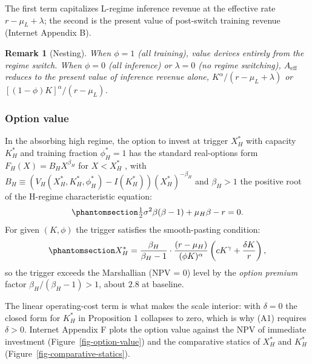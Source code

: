 \documentclass[
  11pt,
  letterpaper,
]{scrartcl}
\begin{document}
The first term capitalizes L-regime inference revenue at the effective
rate \(r - \mu_L + \lambda\); the second is the present value of
post-switch training revenue (Internet Appendix B).

\textbf{Remark 1} (Nesting). \emph{When \(\phi = 1\) (all training),
value derives entirely from the regime switch. When \(\phi = 0\) (all
inference) or \(\lambda = 0\) (no regime switching), \(A_{\text{eff}}\)
reduces to the present value of inference revenue alone,
\(K^\alpha / (r - \mu_L + \lambda)\) or
\([(1-\phi)K]^\alpha / (r - \mu_L)\).}

\subsubsection{Option value}\label{option-value}

In the absorbing high regime, the option to invest at trigger \(X_H^*\)
with capacity \(K_H^*\) and training fraction \(\phi_H^* = 1\) has the
standard real-options form \(F_H(X) = B_H X^{\beta_H}\) for
\(X < X_H^*\) \citep{dixit1994investment}, with
\(B_H \equiv \left(V_H(X_H^*, K_H^*, \phi_H^*) - I(K_H^*)\right) (X_H^*)^{-\beta_H}\)
and \(\beta_H > 1\) the positive root of the H-regime characteristic
equation: \begin{equation}\protect\phantomsection\label{eq-beta-H}{
\tfrac{1}{2}\sigma^2 \beta(\beta - 1) + \mu_H \beta - r = 0.
}\end{equation} For given \((K, \phi)\) the trigger satisfies the
smooth-pasting condition:
\begin{equation}\protect\phantomsection\label{eq-trigger-H}{
X_H^* = \frac{\beta_H}{\beta_H - 1} \cdot \frac{(r - \mu_H)}{(\phi K)^{\alpha}} \left(c K^\gamma + \frac{\delta K}{r}\right),
}\end{equation} so the trigger exceeds the Marshallian (NPV = 0) level
by the \emph{option premium} factor \(\beta_H/(\beta_H - 1) > 1\), about
\(2.8\) at baseline.

The linear operating-cost term is what makes the scale interior: with
\(\delta = 0\) the closed form for \(K_H^*\) in Proposition 1 collapses
to zero, which is why (A1) requires \(\delta > 0\). Internet Appendix F
plots the option value against the NPV of immediate investment
(Figure~\ref{fig-option-value}) and the comparative statics of \(X_H^*\)
and \(K_H^*\) (Figure~\ref{fig-comparative-statics}).
\end{document}
